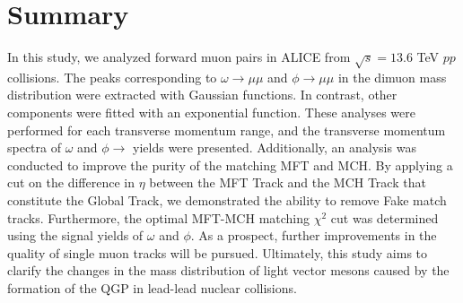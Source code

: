 \section{Summary}
    In this study, we analyzed forward muon pairs in ALICE from $\sqrt{s} = 13.6$ TeV $pp$ collisions. 
    The peaks corresponding to $\omega \rightarrow \mu\mu$ and $\phi \rightarrow \mu\mu$ in the dimuon mass distribution were extracted with Gaussian functions. In contrast, other components were fitted with an exponential function. 
    These analyses were performed for each transverse momentum range, and the transverse momentum spectra of $\omega$ and $\phi \rightarrow$ yields were presented. 
    Additionally, an analysis was conducted to improve the purity of the matching MFT and MCH.
    By applying a cut on the difference in $\eta$ between the MFT Track and the MCH Track that constitute the Global Track, we demonstrated the ability to remove Fake match tracks.
    Furthermore, the optimal MFT-MCH matching $\chi^2$ cut was determined using the signal yields of $\omega$ and $\phi$.
    As a prospect, further improvements in the quality of single muon tracks will be pursued. Ultimately, this study aims to clarify the changes in the mass distribution of light vector mesons caused by the formation of the QGP in lead-lead nuclear collisions.
